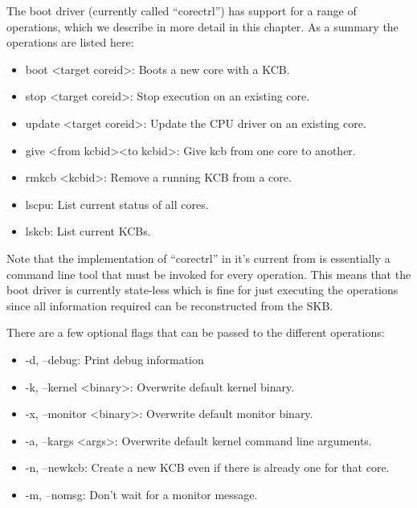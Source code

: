 \documentclass[a4paper,11pt,twoside]{report}
\begin{document}
{{The boot driver (currently called ``corectrl'') has support for a range of
operations, which we describe in more detail in this chapter. As a summary the
operations are listed here:

\begin{itemize}
\item boot \textless target coreid\textgreater: Boots a new core with a KCB.
\item stop \textless target coreid\textgreater: Stop execution on an existing core.
\item update \textless target coreid\textgreater: Update the CPU driver on an existing core.
\item give \textless from kcbid\textgreater \textless to kcbid\textgreater: Give kcb from one core to another.
\item rmkcb \textless kcbid\textgreater: Remove a running KCB from a core.
\item lscpu: List current status of all cores.
\item lskcb: List current KCBs.
\end{itemize}

Note that the implementation of ``corectrl'' in it's current from is essentially
a command line tool that must be invoked for every operation. This means that
the boot driver is currently state-less which is fine for just executing the
operations since all information required can be reconstructed from the SKB.

There are a few optional flags that can be passed to the different operations:
\begin{itemize}
\item -d, --debug: Print debug information
\item -k, --kernel \textless binary\textgreater: Overwrite default kernel binary.
\item -x, --monitor \textless binary\textgreater: Overwrite default monitor binary.
\item -a, --kargs \textless args\textgreater: Overwrite default kernel command line arguments.
\item -n, --newkcb: Create a new KCB even if there is already one for that core.
\item -m, --nomsg: Don't wait for a monitor message.
\end{itemize}


}}
\end{document}
